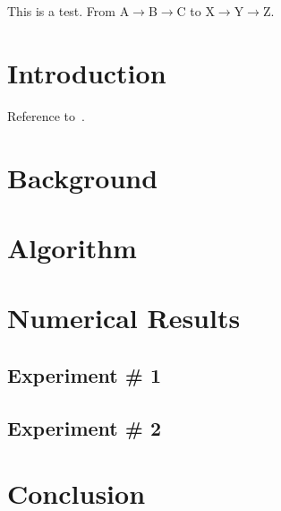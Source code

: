 \documentclass[10pt,letterpaper]{article}
\newcommand{\sequence}[3]{#1$\rightarrow$#2$\rightarrow$#3}
\begin{document}
This is a test.  From \sequence{A}{B}{C} to \sequence{X}{Y}{Z}.

\section{Introduction}

Reference to~\cite{ChOlSe_2021_lsrbm}.

\section{Background}
\section{Algorithm}
\section{Numerical Results}
\subsection{Experiment \# 1}
\subsection{Experiment \# 2}
\section{Conclusion}



\end{document}
